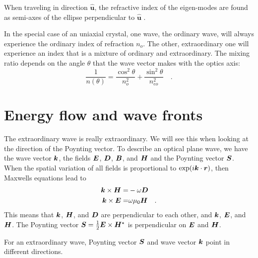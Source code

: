 \begin{marginfigure}
    \caption{When traveling in direction $\boldsymbol{\hat{u}}$, the refractive index of the eigen-modes are found as semi-axes of the ellipse perpendicular to $\boldsymbol{\hat{u}}$ .}
\end{marginfigure}


In the special case of an uniaxial crystal, one wave, the ordinary wave, will always experience the ordinary index of refraction $n_o$. The other, extraordinary  one will experience an index that is a mixture of ordinary and extraordinary. The mixing ratio depends on the angle $\theta$ that the wave vector makes with the optics axis:
\begin{equation}
    \frac{1}{n(\theta)} = \frac{\cos^2 \theta}{n_o^2} + \frac{\sin^2 \theta}{n_{eo}^2} \quad .
    \label{eq:5_neo_theta}
\end{equation}



\section{Energy flow and wave fronts}

The extraordinary wave is really extraordinary. We will see this when looking at the direction of the Poynting vector. To describe an optical plane wave, we have the wave vector $\boldsymbol{k}$, the fields $\boldsymbol{E}$, $\boldsymbol{D}$, $\boldsymbol{B}$, and $\boldsymbol{H}$ and the Poynting vector $\boldsymbol{S}$. When the spatial variation of all fields is proportional to $\exp(i \boldsymbol{k} \cdot \boldsymbol{r})$, then Maxwells equations lead to
\begin{align}
    \boldsymbol{k} \times \boldsymbol{H} = & - \omega \boldsymbol{D}  \label{eq:6_kHD}\\
    \boldsymbol{k} \times \boldsymbol{E} = &  \omega \mu_0 \boldsymbol{H}  \quad .   \label{eq:6_kEH}
\end{align}
This means that $\boldsymbol{k}$, $\boldsymbol{H}$, and  $\boldsymbol{D}$ are perpendicular to each other, and  $\boldsymbol{k}$, $\boldsymbol{E}$, and $\boldsymbol{H}$. The Poynting vector $\boldsymbol{S} = \frac{1}{2} \boldsymbol{E} \times \boldsymbol{H}^\star$ is perpendicular on $\boldsymbol{E}$ and $\boldsymbol{H}$.

\begin{marginfigure}
    \caption{For an extraordinary wave, Poynting vector $\boldsymbol{S}$ and wave vector $\boldsymbol{k}$ point in different directions.
    \label{fig:5_energy_flow}}
\end{marginfigure}

